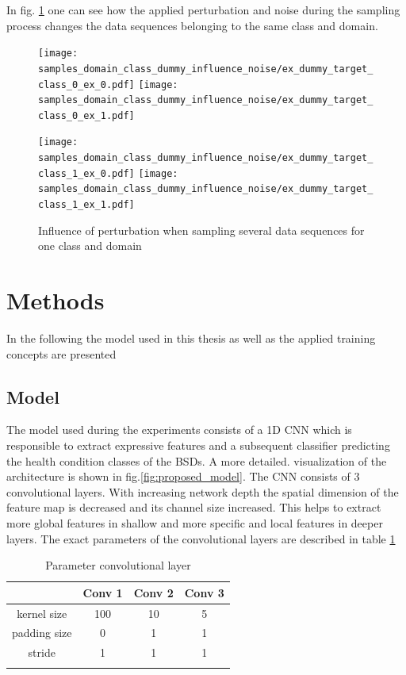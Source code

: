 In fig. \ref{fig:samples_domain_class_dummy_influence_noise} one can see how the applied perturbation and noise during the sampling process changes the data sequences belonging to the same class and domain. 


\begin{figure}[H]
  \centering
  \texttt{[image: samples\_domain\_class\_dummy\_influence\_noise/ex\_dummy\_target\_class\_0\_ex\_0.pdf]}
  \hspace{.3cm}
  \texttt{[image: samples\_domain\_class\_dummy\_influence\_noise/ex\_dummy\_target\_class\_0\_ex\_1.pdf]}

  \vspace{.1cm}

  \texttt{[image: samples\_domain\_class\_dummy\_influence\_noise/ex\_dummy\_target\_class\_1\_ex\_0.pdf]}
  \hspace{.3cm}
  \texttt{[image: samples\_domain\_class\_dummy\_influence\_noise/ex\_dummy\_target\_class\_1\_ex\_1.pdf]}

  \caption{Influence of perturbation when sampling several data sequences for one class and domain}
  \label{fig:samples_domain_class_dummy_influence_noise}
\end{figure}



\section{Methods}\label{chapter:introduction}
In the following the model used in this thesis as well as the applied training concepts are presented

\subsection{Model}
\label{sec:model}
The model used during the experiments consists of a 1D CNN which is responsible to extract expressive features and a subsequent classifier predicting the health condition classes of the BSDs. A more detailed. visualization of the architecture is shown in fig.\ref{fig:proposed_model}. The CNN consists of 3 convolutional layers. With increasing network depth the spatial dimension of the feature map is decreased and its channel size increased. This helps to extract more global features in shallow and more specific and local features in deeper layers. The exact parameters of the convolutional layers are described in table \ref{tab:parameter_conv} 

\begin{longtable}{||c c c c||} 
\hline
& Conv 1 & Conv 2 & Conv 3 \\
\hline
kernel size & 100 & 10 & 5 \\
\hline
padding size & 0 & 1 & 1 \\
\hline
stride & 1 & 1 & 1 \\
\hline
\caption {Parameter convolutional layer}
\label {tab:parameter_conv}
\end{longtable}

